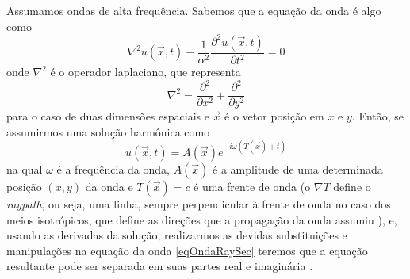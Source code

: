                 Assumamos ondas de alta frequência. Sabemos que a equação da onda é algo como 
                \begin{equation}
                    \label{eqOndaRaySec}
                    \nabla^2u(\vec{x}, t) - \dfrac{1}{\alpha^2}\dfrac{\partial^2u(\vec{x}, t)}{\partial t^2} = 0
                \end{equation}
                onde $\nabla^2$ é o operador laplaciano, que representa
                \begin{equation}
                    \nabla^2 = \dfrac{\partial^2}{\partial x^2} + \dfrac{\partial^2}{\partial y^2}
                \end{equation}
                para o caso de duas dimensões espaciais e $\vec{x}$ é o vetor posição em $x$ e $y$. Então, se assumirmos uma solução harmônica como
                \begin{equation}
                    u(\vec{x}, t) = A(\vec{x})e^{-i\omega(T(\vec{x}) + t)}
                \end{equation}
                na qual $\omega$ é a frequência da onda, $A(\vec{x})$ é a amplitude de uma determinada posição $(x, y)$ da onda e $T(\vec{x}) = c$ é uma frente de onda (o $\nabla T$ define o \textit{raypath}, ou seja, uma linha, sempre perpendicular à frente de onda no caso dos meios isotrópicos, que define as direções que a propagação da onda assumiu \cite{OilfieldGlossary:raypath}), e, usando as derivadas da solução, realizarmos as devidas substituições e manipulações na equação da onda \ref{eqOndaRaySec} teremos que a equação resultante pode ser separada em suas partes real e imaginária \cite{RawlinsonSlide06_RayTheory}.
                
